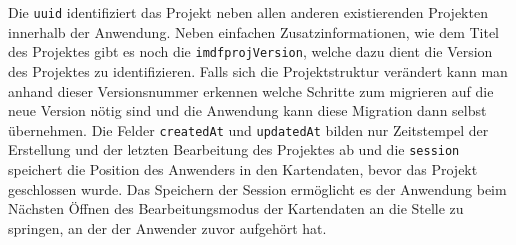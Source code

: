Die \texttt{uuid} identifiziert das Projekt neben allen anderen existierenden Projekten innerhalb der Anwendung.
Neben einfachen Zusatzinformationen, wie dem Titel des Projektes gibt es noch die \texttt{imdfprojVersion}, welche dazu dient die Version des Projektes zu identifizieren.
Falls sich die Projektstruktur verändert kann man anhand dieser Versionsnummer erkennen welche Schritte zum migrieren auf die neue Version nötig sind und die Anwendung kann diese Migration dann selbst übernehmen.
Die Felder \texttt{createdAt} und \texttt{updatedAt} bilden nur Zeitstempel der Erstellung und der letzten Bearbeitung des Projektes ab und die \texttt{session} speichert die Position des Anwenders in den Kartendaten, bevor das Projekt geschlossen wurde.
Das Speichern der Session ermöglicht es der Anwendung beim Nächsten Öffnen des Bearbeitungsmodus der Kartendaten an die Stelle zu springen, an der der Anwender zuvor aufgehört hat.

